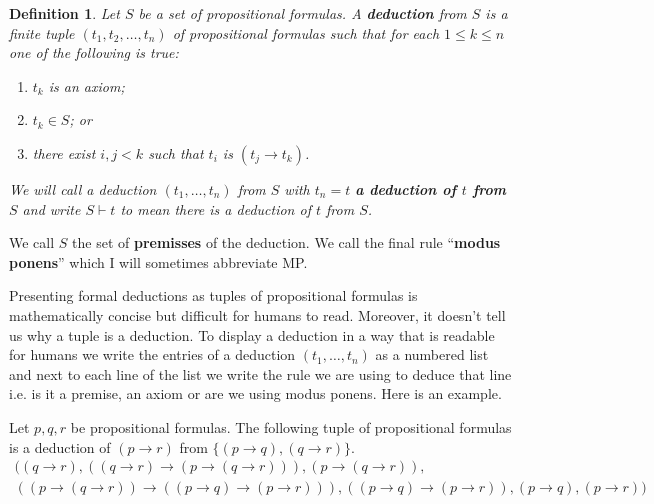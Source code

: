 \documentclass[11pt]{article}
\newtheorem{definition}[theorem]{Definition}
\begin{document}
\begin{definition}
Let $S$ be a set of propositional formulas. A \textbf{deduction} from $S$ is a finite tuple $(t_1,t_2,\ldots,t_n)$ of propositional formulas such that for each $1\leq k\leq n$ one of the following is true:
\begin{enumerate}
\item $t_k$ is an axiom;
\item $t_k\in S$; or
\item there exist $i,j<k$ such that $t_i$ is $(t_j\rightarrow t_k)$.
\end{enumerate}

We will call a deduction $(t_1,\ldots,t_n)$ from $S$ with $t_n=t$ \textbf{a deduction of $t$ from $S$} and write
 $S\vdash t$ to mean there is a deduction of $t$ from $S$.

\end{definition}



We call $S$ the set of \textbf{premisses} of the deduction. We call the final rule ``\textbf{modus ponens}'' which I will sometimes abbreviate MP.

Presenting formal deductions as tuples of propositional formulas is mathematically concise but difficult for humans to read. Moreover, it doesn't tell us why a tuple is a deduction. To display a deduction in a way that is readable for humans we write the entries of a deduction $(t_1,\ldots, t_n)$ as a numbered list and next to each line of the list we write the rule we are using to deduce that line i.e. is it a premise, an axiom or are we using modus ponens. %
Here is an example.

\medskip

Let $p,q,r$ be propositional formulas. The following tuple of propositional formulas is a deduction of $(p\rightarrow r)$ from $\{(p\rightarrow q),(q\rightarrow r)\}$.
\begin{multline*}
((q\rightarrow r), ((q\rightarrow r)\rightarrow (p\rightarrow (q\rightarrow r))), (p\rightarrow (q\rightarrow r)), \\ ((p\rightarrow(q\rightarrow r))\rightarrow ((p\rightarrow q)\rightarrow(p\rightarrow r))), ((p\rightarrow q)\rightarrow (p\rightarrow r)), (p\rightarrow q), (p\rightarrow r))
\end{multline*}
%
\end{document}
